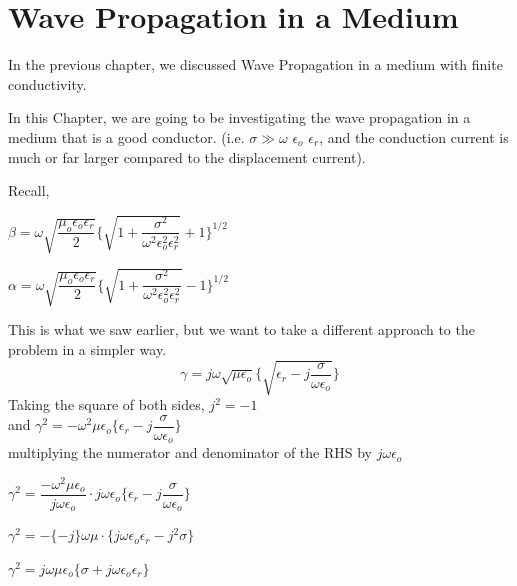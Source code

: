\chapter{Wave Propagation in a Medium}\label{lec:lec26}
In the previous chapter, we discussed Wave Propagation in a medium with finite conductivity.

In this Chapter, we are going to be investigating the wave propagation in a medium that is a good conductor. (i.e. $\sigma \gg \omega$ $\epsilon_{o}$ $\epsilon_{r}$, and the conduction current is much or far larger compared to the displacement current).

Recall,
\begin{center}
$\beta=\omega\sqrt{\dfrac{\mu_{o}\epsilon_{o}\epsilon_{r}}{2}}\Bigg\{{\sqrt{1+\dfrac{\sigma^{2}}{\omega^{2}\epsilon_{o}^{2}\epsilon_{r}^{2}}}+1 }\Bigg\}^{1/2}$
\end{center}

\begin{center}
$\alpha=\omega\sqrt{\dfrac{\mu_{o}\epsilon_{o}\epsilon_{r}}{2}}\Bigg\{\sqrt{1+\dfrac{\sigma^{2}}{\omega^{2}\epsilon_{o}^{2}\epsilon_{r}^{2}}}  -1\Bigg\}^{1/2}$	
\end{center}

This is what we saw earlier, but we want to take a different approach to the problem in a simpler way.
\begin{equation}
\gamma=j\omega\sqrt{\mu\epsilon_{o}}\Bigg\{\sqrt{\epsilon_{r}-j\dfrac{\sigma}{\omega\epsilon_{o}}}\Bigg\}
\end{equation}		
Taking the square of both sides,
$j^{2}= -1$\\ 
and $\gamma^{2}=-\omega^{2}\mu\epsilon_{o}\Bigg\{\epsilon_{r}-j\dfrac{\sigma}{\omega\epsilon_{o}}\Bigg\}$\\
multiplying the numerator and denominator of the RHS  by $j\omega\epsilon_{o}$

$\gamma^{2}=\dfrac{-\omega^{2}\mu\epsilon_{o}}{j\omega\epsilon_{o}}\cdot j\omega\epsilon_{o}\Bigg\{\epsilon_{r}-j\dfrac{\sigma}{\omega\epsilon_{o}}\Bigg\}$

\begin{center}
$\gamma^{2}=-\{-j\}\omega\mu\cdot\{j\omega\epsilon_{o}\epsilon_{r}-j^{2}\sigma\}$
\end{center}

\begin{center}
$\gamma^{2}=j\omega\mu\epsilon_{o}\{\sigma+j\omega\epsilon_{o}\epsilon_{r}\}$	
\end{center}

